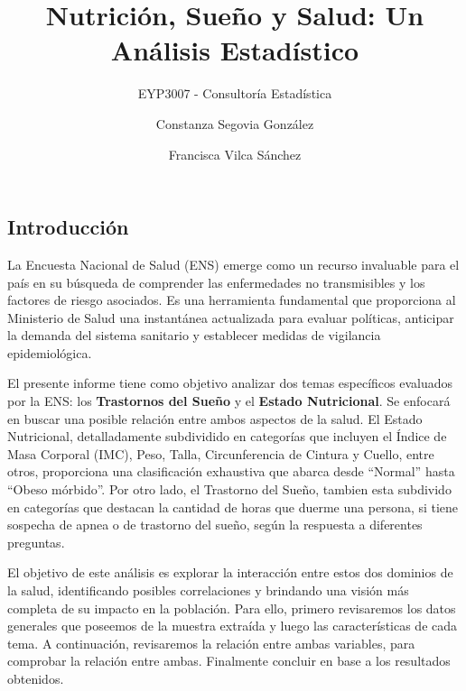 \documentclass[
  10pt,
  letterpaper,
  DIV=11,
  numbers=noendperiod,
  twocolumn]{scrartcl}
\title{Nutrición, Sueño y Salud: Un Análisis Estadístico}
\subtitle{EYP3007 - Consultoría Estadística}
\author{Constanza Segovia González \and Francisca Vilca Sánchez}
\date{}
\begin{document}
\maketitle
\ifdefined\Shaded\renewenvironment{Shaded}{\begin{tcolorbox}[interior hidden, frame hidden, breakable, boxrule=0pt, enhanced, sharp corners, borderline west={3pt}{0pt}{shadecolor}]}{\end{tcolorbox}}\fi

\onecolumn
\newpage

\tableofcontents

\newpage
\twocolumn

\hypertarget{introducciuxf3n}{%
\subsection{Introducción}\label{introducciuxf3n}}

La Encuesta Nacional de Salud (ENS) emerge como un recurso invaluable
para el país en su búsqueda de comprender las enfermedades no
transmisibles y los factores de riesgo asociados. Es una herramienta
fundamental que proporciona al Ministerio de Salud una instantánea
actualizada para evaluar políticas, anticipar la demanda del sistema
sanitario y establecer medidas de vigilancia epidemiológica.

El presente informe tiene como objetivo analizar dos temas específicos
evaluados por la ENS: los \textbf{Trastornos del Sueño} y el
\textbf{Estado Nutricional}. Se enfocará en buscar una posible relación
entre ambos aspectos de la salud. El Estado Nutricional, detalladamente
subdividido en categorías que incluyen el Índice de Masa Corporal (IMC),
Peso, Talla, Circunferencia de Cintura y Cuello, entre otros,
proporciona una clasificación exhaustiva que abarca desde ``Normal''
hasta ``Obeso mórbido''. Por otro lado, el Trastorno del Sueño, tambien
esta subdivido en categorías que destacan la cantidad de horas que
duerme una persona, si tiene sospecha de apnea o de trastorno del sueño,
según la respuesta a diferentes preguntas.

El objetivo de este análisis es explorar la interacción entre estos dos
dominios de la salud, identificando posibles correlaciones y brindando
una visión más completa de su impacto en la población. Para ello,
primero revisaremos los datos generales que poseemos de la muestra
extraída y luego las características de cada tema. A continuación,
revisaremos la relación entre ambas variables, para comprobar la
relación entre ambas. Finalmente concluir en base a los resultados
obtenidos.
\end{document}
